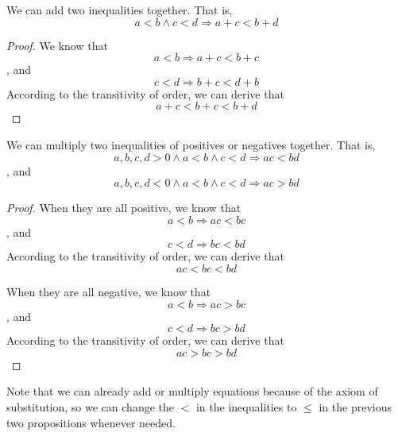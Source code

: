\begin{prop} \label{prop.4.2.add.ineq}
We can add two inequalities together. That is,
\[
a<b \wedge c<d \Longrightarrow a+c<b+d
\]
\end{prop}
\begin{proof}
We know that
\[
a<b \Longrightarrow a+c<b+c 
\]
, and
\[
c<d \Longrightarrow b+c<d+b 
\]
According to the transitivity of order, we can derive that
\[
a+c<b+c<b+d
\]
\end{proof}

\begin{prop} \label{prop.4.2.multiply.ineq}
We can multiply two inequalities of positives or negatives together. That is,
\[
a,b,c,d >0 \wedge a<b \wedge c<d \Longrightarrow ac<bd
\]
, and
\[
a,b,c,d <0 \wedge a<b \wedge c<d \Longrightarrow ac>bd
\]
\end{prop}
\begin{proof}
When they are all positive,
we know that
\[
a<b \Longrightarrow ac<bc
\]
, and
\[
c<d \Longrightarrow bc<bd
\]
According to the transitivity of order, we can derive that
\[
ac<bc<bd
\]

When they are all negative,
we know that
\[
a<b \Longrightarrow ac>bc
\]
, and
\[
c<d \Longrightarrow bc>bd
\]
According to the transitivity of order, we can derive that
\[
ac>bc>bd
\]
\end{proof}

Note that we can already add or multiply equations because of the axiom of substitution, so we can change 
the $<$ in the inequalities to $\leq$ in the previous two propositions whenever needed.

